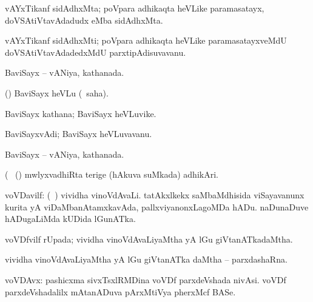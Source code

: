 \bentry
{} 
\gl{\nA}
\expl{}
\bmng
 vAYxTikanf sidAdhxMta; poVpara adhikaqta heVLike paramasatayx, doVSAtiVtavAdadudx eMba sidAdhxMta. 
\emng
\eentry

\bentry
{} 
\gl{\nA}
\expl{}
\bmng
 vAYxTikanf sidAdhxMti; poVpara adhikaqta heVLike paramasatayxveMdU doVSAtiVtavAdadedxMdU parxtipAdisuvavanu. 
\emng
\eentry

\bentry
{} 
\gl{\gu}
\expl{}
\bmng
 BaviSayx -- vANiya, kathanada. 
\emng
\eentry

\bentry
{} 
\gl{\sakirx}
\expl{}
\bmng
 (\aupa) BaviSayx heVLu (\akirx\ saha). 
\emng
\eentry

\bentry
{} 
\gl{\nA}
\expl{}
\bmng
 BaviSayx kathana; BaviSayx heVLuvike. 
\emng
\eentry

\bentry
{} 
\gl{\nA}
\expl{}
\bmng
 BaviSayxvAdi; BaviSayx heVLuvavanu. 
\emng
\eentry

\bentry
{} 
\gl{\gu}
\expl{}
\bmng
 BaviSayx -- vANiya, kathanada. 
\emng
\eentry

\bentry
{} 
\gl{\nA}(\bava\ 
\bmng
 (\AmA) mwlyxvadhiRta terige (hAkuva suMkada) adhikAri. 
\emng
\eentry

\bentry
{} 
\gl{\nA}
\expl{}
\bmng
 voVDavilf: 
\banum
{} (\kanmu\ \ame) vividha vinoVdAvaLi. 
 tatAkxlkekx saMbaMdhisida viSayavanunx kurita yA viDaMbanAtamxkavAda, pallxviyanonxLagoMDa hADu. 
 naDunaDuve hADugaLiMda kUDida lGunATka. 
\eanum
\emng
\eentry

\bentry
{} 
\gl{\gu}
\expl{}
\bmng
voVDfvilf rUpada; vividha vinoVdAvaLiyaMtha yA lGu giVtanATkadaMtha. 
\emng
\eentry

\bentry
{} 
\gl{\nA}
\expl{}
\bmng
 vividha vinoVdAvaLiyaMtha yA lGu giVtanATka daMtha -- parxdashaRna. 
\emng
\eentry

\bentry
{}
\gl{\nA}
\bmng
 voVDAvx: 
\banum
{} pashicxma sivxTsxlRMDina voVDf parxdeVshada nivAsi. 
 voVDf parxdeVshadalilx mAtanADuva pArxMtiVya pherxMcf BASe. 
\eanum
\emng
\eentry

